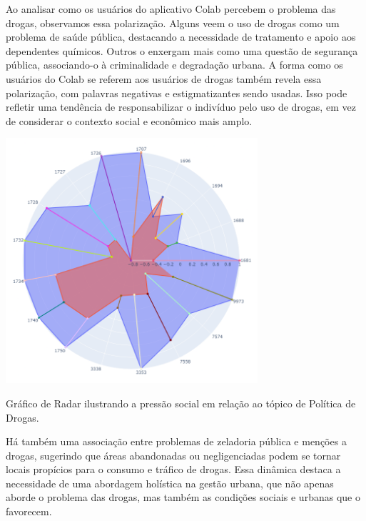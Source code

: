 Ao analisar como os usuários do aplicativo Colab percebem o problema das drogas, observamos essa polarização. Alguns veem o uso de drogas como um problema de saúde pública, destacando a necessidade de tratamento e apoio aos dependentes químicos. Outros o enxergam mais como uma questão de segurança pública, associando-o à criminalidade e degradação urbana. A forma como os usuários do Colab se referem aos usuários de drogas também revela essa polarização, com palavras negativas e estigmatizantes sendo usadas. Isso pode refletir uma tendência de responsabilizar o indivíduo pelo uso de drogas, em vez de considerar o contexto social e econômico mais amplo.

\begin{quadro}[htb]
	\centering
	\includegraphics[width=0.7\textwidth]{images/social_barometer_drugs.png}
	\caption{Gráfico de Radar ilustrando a pressão social em relação ao tópico de Política de Drogas.}
	\label{fig:social_barometer_drugs}
\end{quadro}

Há também uma associação entre problemas de zeladoria pública e menções a drogas, sugerindo que áreas abandonadas ou negligenciadas podem se tornar locais propícios para o consumo e tráfico de drogas. Essa dinâmica destaca a necessidade de uma abordagem holística na gestão urbana, que não apenas aborde o problema das drogas, mas também as condições sociais e urbanas que o favorecem.

